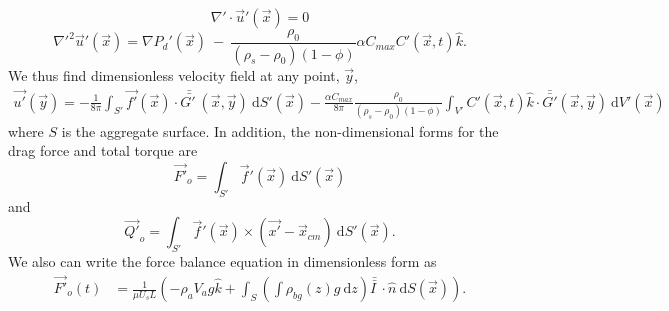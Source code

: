 \begin{equation}
	\nabla' \cdot \vec{u}'(\vec{x}) =0
	\label{eq_continuity_nonD}
\end{equation}
\begin{equation}
	{\nabla'}^2  \vec{u}'(\vec{x})
	= \nabla {P_d}' (\vec{x}) \ - \  
	\frac{\rho_0}{(\rho_s - \rho_0)(1-\phi)} \alpha C_{max} C'(\vec{x},t)  \hat{k}.
\label{eq_extra_C_nonD}
\end{equation}
We thus find dimensionless velocity field at any point, $\vec{y}$,
 \begin{align}
		\vec{u'}\left(\vec{y} \right) 
			  =- \frac{1}{8 \pi} \int_{S'}  
			 \vec{f'}(\vec{x}) 
			 \cdot \bar{\bar{G' \ }} (\vec{x},\vec{y}) 
			 \ \textrm{d}S'(\vec{x})
-\frac{ \alpha C_{max}}{8\pi } \frac{\rho_0}{(\rho_s - \rho_0)(1-\phi)} 
\int_{V'} C' \left(\vec{x},  t \right) \hat{k} \cdot 
\bar{\bar{G'  }}(\vec{x}, \vec{y} ) 
\ \text{d}V'(\vec{x})
  \label{eq_vel_all_onS_nonD}
 \end{align}
where $S$ is the aggregate surface. 
In addition, the non-dimensional forms for the drag force and total torque are 
\begin{equation}
 \vec{F'}_o
  = \int_{S'} \vec{f}'(\vec{x}) \  \text{d}S'(\vec{x})
 \label{eq_total_Force_dlp_nonD}
 \end{equation} 
 and
 \begin{equation}
 \vec{Q'}_o 
 = \int_{S'} \vec{f}'(\vec{x}) \times  (\vec{x'} - \vec{x}_{cm})  \ \text{d}S'(\vec{x}).
 \label{eq_total_Torque_dlp_nonD}
 \end{equation}
 We also can write the force balance equation in dimensionless form as 
\begin{align*}
	 \vec{F'}_o(t)
	 & =
	  \frac{1}{\mu U_s L} 
	  \left(
	-   \rho_a V_a g \hat{k}
	  +
	   \int_{S} \left( 
	   \int \rho_{bg}(z) g \ \textrm{d}z 
	   \right) \bar{\bar{I \ }}  \cdot
	  \hat{n} \ \textrm{d}S (\vec{x})
	\right).
\label{eq_Full_Force_nonD}
\end{align*}

